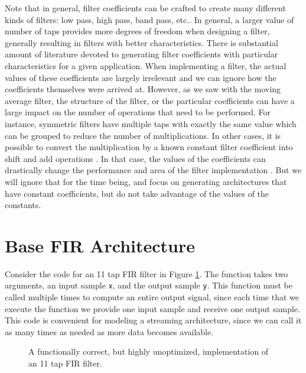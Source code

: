 Note that in general, filter coefficients can be crafted to create many different kinds of filters: low pass, high pass, band pass, etc.. In general, a larger value of number of taps provides more degrees of freedom when designing a filter, generally resulting in filters with better characteristics. There is substantial amount of literature devoted to generating filter coefficients with particular characteristics for a given application. When implementing a filter, the actual values of these coefficients are largely irrelevant and we can ignore how the coefficients themselves were arrived at.  However, as we saw with the moving average filter, the structure of the filter, or the particular coefficients can have a large impact on the number of operations that need to be performed.  For instance, symmetric filters have multiple taps with exactly the same value which can be grouped to reduce the number of multiplications.  In other cases, it is possible to convert the multiplication by a known constant filter coefficient into shift and add operations \cite{kastner2010arithmetic}. In that case, the values of the coefficients can drastically change the performance and area of the filter implementation \cite{mirzaei2007fpga}. But we will ignore that for the time being, and focus on generating architectures that have constant coefficients, but do not take advantage of the values of the constants.

\section{Base FIR Architecture}
\label{sec:base_fir}

Consider the code for an 11 tap FIR filter in Figure \ref{fig:fir11_initial}. The function takes two arguments, an input sample \lstinline{x}, and the output sample \lstinline{y}. This function must be called multiple times to compute an entire output signal, since each time that we execute the function we provide one input sample and receive one output sample. This code is convenient for modeling a streaming architecture, since we can call it as many times as needed as more data becomes available.

\begin{figure}

\caption{A functionally correct, but highly unoptimized, implementation of an 11 tap FIR filter. }
\label{fig:fir11_initial}
\end{figure}

